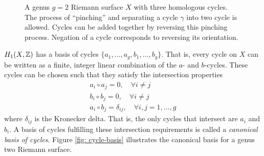 \begin{figure}
  \caption{A genus $g=2$ Riemann surface $X$ with three homologous cycles. The
    process of ``pinching'' and separating a cycle $\gamma$ into two cycle is
    allowed. Cycles can be added together by reversing this pinching process.
    Negation of a cycle corresponds to reversing its orientation.}
  \label{fig: pinching}
\end{figure}

$H_1(X,\operatorname{\mathbb{Z}})$ has a basis of cycles $\{a_1,\ldots,a_g,b_1,\ldots,b_g\}$. That is,
every cycle on $X$ can be written as a finite, integer linear combination of the
$a$- and $b$-cycles. These cycles can be chosen such that they satisfy the
intersection properties
\begin{gather*}
  a_i \circ a_j = 0, \quad \forall i \neq j \\
  b_i \circ b_j = 0, \quad \forall i \neq j \\
  a_i \circ b_j = \delta_{ij}, \quad \forall i,j = 1, \ldots, g
\end{gather*}
where $\delta_{ij}$ is the Kronecker delta. That is, the only cycles that
intersect are $a_i$ and $b_i$. A basis of cycles fulfilling these intersection
requirements is called a {\it canonical basis of cycles}. Figure \ref{fig:
  cycle-basis} illustrates the canonical basis for a genus two Riemann surface.

